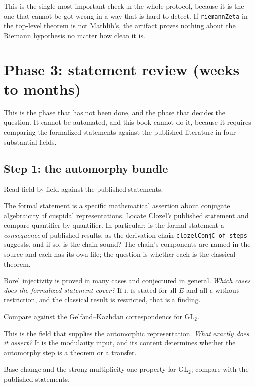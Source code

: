 This is the single most important check in the whole protocol, because it is
the one that cannot be got wrong in a way that is hard to detect. If
\texttt{riemannZeta} in the top-level theorem is not Mathlib's, the artifact
proves nothing about the Riemann hypothesis no matter how clean it is.

\section{Phase 3: statement review (weeks to months)}This is the phase that has not been done, and the phase that decides the
question. It cannot be automated, and this book cannot do it, because it
requires comparing the formalized statements against the published literature
in four substantial fields.

\subsection{Step 1: the automorphy bundle}Read  field by field against the
published statements.

\begin{description}[style=nextline,leftmargin=0pt,labelwidth=0pt,labelsep=0pt,font=\sffamily\bfseries\small,
  itemsep=5pt]
\item[\texttt{conjC : ClozelConjC}.] The formal statement is a specific
mathematical assertion about conjugate algebraicity of cuspidal
representations. Locate Clozel's published statement and compare quantifier
by quantifier. In particular: is the formal statement a \emph{consequence} of
published results, as the derivation chain
\texttt{clozelConjC\_of\_steps} suggests, and if so, is the chain sound? The
chain's components are named in the source and each has its own file; the
question is whether each is the classical theorem.
\item[\texttt{borelC : BorelInjC}.] Borel injectivity is proved in many cases
and conjectured in general. \emph{Which cases does the formalized statement
cover?} If it is stated for all $E$ and all $a$ without restriction, and the
classical result is restricted, that is a finding.
\item[\code{gkR : GelfandKazhdanReal}.] Compare against the Gelfand--Kazhdan
correspondence for $\mathrm{GL}_2$.
\item[\texttt{newform : NewformRep}.] This is the field that supplies the
automorphic representation. \emph{What exactly does it assert?} It is the
modularity input, and its content determines whether the automorphy step is a
theorem or a transfer.
\item[\texttt{galR}, \texttt{smoR}, \texttt{bc}.] Base change and the strong
multiplicity-one property for $\mathrm{GL}_2$; compare with the published
statements.
\end{description}

